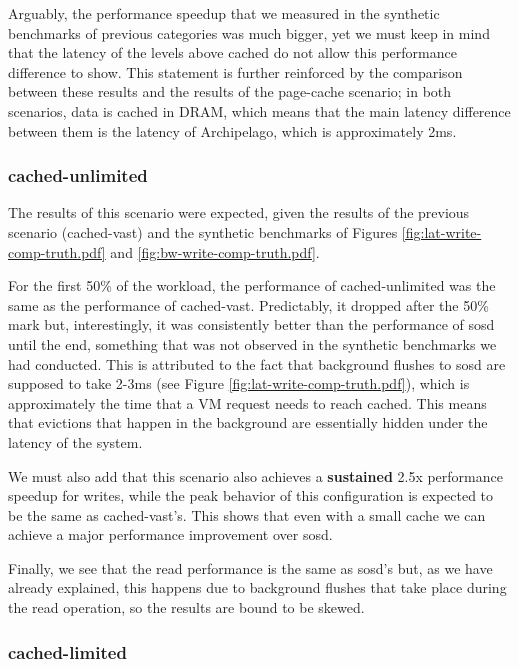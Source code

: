 Arguably, the performance speedup that we measured in the synthetic benchmarks 
of previous categories was much bigger, yet we must keep in mind that the 
latency of the levels above cached do not allow this performance difference to 
show.  This statement is further reinforced by the comparison between these 
results and the results of the page-cache scenario; in both scenarios, data is 
cached in DRAM, which means that the main latency difference between them is 
the latency of Archipelago, which is approximately 2ms.

\subsubsection{cached-unlimited}

The results of this scenario were expected, given the results of the previous 
scenario (cached-vast) and the synthetic benchmarks of Figures 
\ref{fig:lat-write-comp-truth.pdf} and \ref{fig:bw-write-comp-truth.pdf}.

For the first 50\% of the workload, the performance of cached-unlimited was the 
same as the performance of cached-vast. Predictably, it dropped after the 50\% 
mark but, interestingly, it was consistently better than the performance of 
sosd until the end, something that was not observed in the synthetic benchmarks 
we had conducted.  This is attributed to the fact that background flushes to 
sosd are supposed to take 2-3ms (see Figure 
\ref{fig:lat-write-comp-truth.pdf}), which is approximately the time that a VM 
request needs to reach cached.  This means that evictions that happen in the 
background are essentially hidden under the latency of the system.

We must also add that this scenario also achieves a \textbf{sustained} 2.5x 
performance speedup for  writes, while the peak behavior of this configuration 
is expected to be the same as cached-vast's. This shows that even with a small 
cache we can achieve a major performance improvement over sosd. 

Finally, we see that the read performance is the same as sosd's but, as we have 
already explained, this happens due to background flushes that take place 
during the read operation, so the results are bound to be skewed.

\subsubsection{cached-limited}

